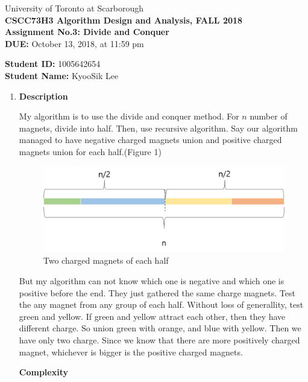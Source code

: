 \documentclass[a4paper,11pt]{article}
\begin{document}
\begin{center}
University of Toronto at Scarborough\\[0.1in]
{\bf CSCC73H3 Algorithm Design and Analysis, FALL 2018} \\[0.1in]
{\large{\bf Assignment No.3: Divide and Conquer}}\\[0.1in]
{\bf DUE:} October 13, 2018, at 11:59 pm
\end{center}


\vspace{0.1in}
\noindent
{\bf Student ID:} 1005642654 \\[0.15in]
{\bf Student Name:} KyooSik Lee
\vspace{0.3in}

\vspace{0.3in}
\begin{enumerate}

\item {\bf Description}

My algorithm is to use the divide and conquer method.
For $n$ number of magnets, divide into half.
Then, use recursive algorithm.
Say our algorithm managed to have negative charged magnets union and positive charged magnets union for each half.(Figure 1)


\begin{figure}[hbt]
	\centering
	\includegraphics[scale=0.6]{figure1.png}
	\caption{Two charged magnets of each half}
\end{figure}

But my algorithm can not know which one is negative and which one is positive before the end. 
They just gathered the same charge magnets.
Test the any magnet from any group of each half.
Without loss of generallity, test green and yellow.
If green and yellow attract each other, then they have different charge. So union green with orange, and blue with yellow.
Then we have only two charge. Since we know that there are more positively charged magnet, whichever is bigger is the positive charged magnets.

{\bf Complexity}


\end{enumerate}
\end{document}
